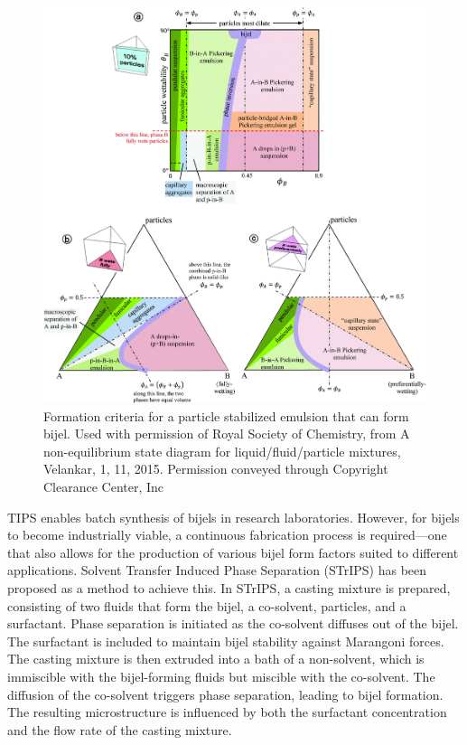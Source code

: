 \begin{figure}
    \centering
    \includegraphics[scale = 0.3]{figures/literature_review/state_diagram.jpg}
    \caption{Formation criteria for a particle stabilized emulsion that can form bijel. \cite{velankar_non-equilibrium_2015}
            Used with permission of Royal Society of Chemistry, from A non-equilibrium state diagram for liquid/fluid/particle 
            mixtures, Velankar, 1, 11, 2015. Permission conveyed through Copyright Clearance Center, Inc}
    \label{fig:state_diagram_particle_emulsions}
\end{figure}

TIPS enables batch synthesis of bijels in research laboratories. However, for bijels to become industrially viable, a continuous fabrication process is required—one 
that also allows for the production of various bijel form factors suited to different applications. Solvent Transfer Induced Phase Separation (STrIPS) has been proposed 
as a method to achieve this. In STrIPS, a casting mixture is prepared, consisting of two fluids that form the bijel, a co-solvent, particles, and a surfactant. Phase 
separation is initiated as the co-solvent diffuses out of the bijel. The surfactant is included to maintain bijel stability against Marangoni forces. The casting mixture 
is then extruded into a bath of a non-solvent, which is immiscible with the bijel-forming fluids but miscible with the co-solvent. The diffusion of the co-solvent triggers 
phase separation, leading to bijel formation. The resulting microstructure is influenced by both the surfactant concentration and the flow rate of the casting mixture.

